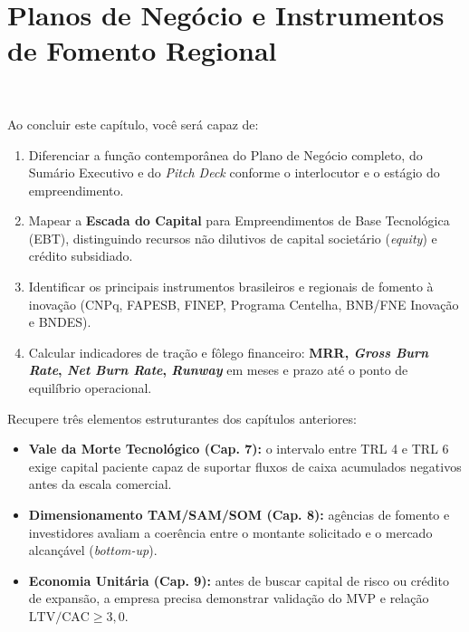 \chapter{Planos de Negócio e Instrumentos de Fomento Regional}
\label{cap:10}

\noindent\tagTerritorio\ 

\begin{capObjetivos}
  Ao concluir este capítulo, você será capaz de:
  \begin{enumerate}[leftmargin=1.5em, itemsep=2pt]
    \item Diferenciar a função contemporânea do Plano de Negócio completo, do Sumário Executivo e do \textit{Pitch Deck} conforme o interlocutor e o estágio do empreendimento.
    \item Mapear a \textbf{Escada do Capital} para Empreendimentos de Base Tecnológica (EBT), distinguindo recursos não dilutivos de capital societário (\textit{equity}) e crédito subsidiado.
    \item Identificar os principais instrumentos brasileiros e regionais de fomento à inovação (CNPq, FAPESB, FINEP, Programa Centelha, BNB/FNE Inovação e BNDES).
    \item Calcular indicadores de tração e fôlego financeiro: \textbf{MRR, \textit{Gross Burn Rate}, \textit{Net Burn Rate}, \textit{Runway}} em meses e prazo até o ponto de equilíbrio operacional.
  \end{enumerate}
\end{capObjetivos}

\begin{capRevisao}
  Recupere três elementos estruturantes dos capítulos anteriores:
  \begin{itemize}[leftmargin=1.5em, itemsep=2pt]
    \item \textbf{Vale da Morte Tecnológico (Cap. 7):} o intervalo entre TRL 4 e TRL 6 exige capital paciente capaz de suportar fluxos de caixa acumulados negativos antes da escala comercial.
    \item \textbf{Dimensionamento TAM/SAM/SOM (Cap. 8):} agências de fomento e investidores avaliam a coerência entre o montante solicitado e o mercado alcançável (\textit{bottom-up}).
    \item \textbf{Economia Unitária (Cap. 9):} antes de buscar capital de risco ou crédito de expansão, a empresa precisa demonstrar validação do MVP e relação $\text{LTV/CAC} \ge 3{,}0$.
  \end{itemize}
\end{capRevisao}

